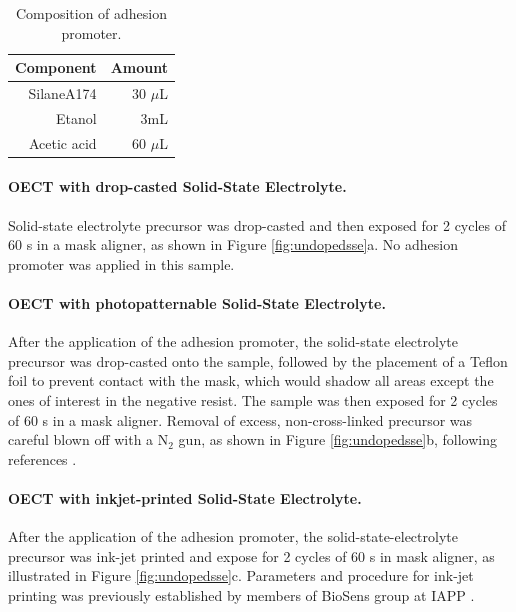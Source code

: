 \begin{table}[ht]
	\centering
	\caption{Composition of adhesion promoter.}
	\begin{tabular}{r r} \hline
		Component   & Amount \\ \hline
		SilaneA174	& 30 $\mu$L \\ 
		Etanol   & 3mL \\ 
		Acetic acid   & 60 $\mu$L \\ \hline
	\end{tabular}
	\label{tab:adprom}
\end{table}

\paragraph{OECT with drop-casted Solid-State Electrolyte.}Solid-state electrolyte precursor was drop-casted and then exposed for 2 cycles of 60 s in a mask aligner, as shown in Figure \ref{fig:undopedsse}a. No adhesion promoter was applied in this sample.

\paragraph{OECT with photopatternable Solid-State Electrolyte.}After the application of the adhesion promoter, the solid-state electrolyte precursor was drop-casted onto the sample, followed by the placement of a Teflon foil to prevent contact with the mask, which would shadow all areas except the ones of interest in the negative resist. The sample was then exposed for 2 cycles of 60 s in a mask aligner. Removal of excess, non-cross-linked precursor was careful blown off with a N$_{2}$ gun, as shown in Figure \ref{fig:undopedsse}b,  following references \cite{weissbachPhotopatternableSolidElectrolyte2022}\cite{bongartzOrganicElectrochemicalTransistors2021}.

\paragraph{OECT with inkjet-printed Solid-State Electrolyte.}After the application of the adhesion promoter, the solid-state-electrolyte precursor was ink-jet printed and expose for 2 cycles of 60 s in mask aligner, as illustrated in Figure \ref{fig:undopedsse}c. Parameters and procedure for ink-jet printing was previously established by members of BioSens group at IAPP \cite{tsengThresholdVoltageControl2023}. 

